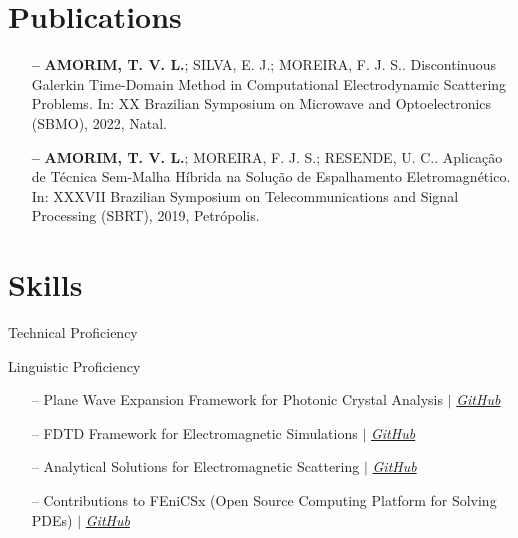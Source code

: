 \documentclass{cv}
\begin{document}
\section{Publications}
\begin{itemize}[leftmargin=10pt]
    \item[\textbf{--}] \textbf{AMORIM, T. V. L.}; SILVA, E. J.;
        MOREIRA, F. J. S.. Discontinuous Galerkin Time-Domain Method
        in Computational Electrodynamic Scattering Problems. In: XX
        Brazilian Symposium on Microwave and Optoelectronics (SBMO),
        2022, Natal.
    \item[\textbf{--}] \textbf{AMORIM, T. V. L.}; MOREIRA, F. J. S.;
        RESENDE, U. C.. Aplicação de Técnica Sem-Malha Híbrida na
        Solução de Espalhamento Eletromagnético. In: XXXVII Brazilian
        Symposium on Telecommunications and Signal Processing (SBRT),
        2019, Petrópolis.
\end{itemize}

\section{Skills}
Technical Proficiency \vspace{-6pt}
\begin{itemize}
\end{itemize}
Linguistic Proficiency \vspace{-6pt}
\begin{itemize}
\end{itemize}

\begin{itemize}[leftmargin=10pt, itemsep=0pt]
    \item[--] Plane Wave Expansion Framework for Photonic Crystal Analysis
        $|$
        \emph{\href{https://github.com/tiagovla/morpho.py}{\color{blue}GitHub}}
    \item[--] FDTD Framework for Electromagnetic Simulations
        $|$
        \emph{\href{https://github.com/tiagovla/fdtd.py}{\color{blue}GitHub}}
    \item[--] Analytical Solutions for Electromagnetic Scattering
        $|$
        \emph{\href{https://github.com/tiagovla/scatsol}{\color{blue}GitHub}}
    \item[--] Contributions to FEniCSx (Open Source Computing
        Platform for Solving PDEs)
        $|$ \emph{\href{https://github.com/FEniCS}{\color{blue}GitHub}}
\end{itemize}
\end{document}
